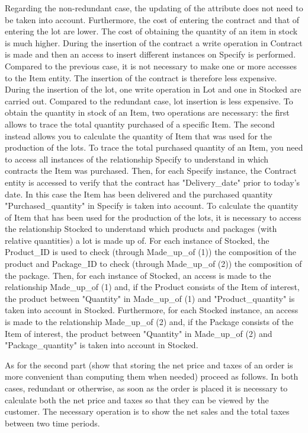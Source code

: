 Regarding the non-redundant case, the updating of the attribute does not need to be taken into account. Furthermore, the cost of entering the contract and that of entering the lot are lower. The cost of obtaining the quantity of an item in stock is much higher.
During the insertion of the contract a write operation in Contract is made and then an access to insert different instances on Specify is performed. Compared to the previous case, it is not necessary to make one or more accesses to the Item entity. The insertion of the contract is therefore less expensive.
During the insertion of the lot, one write operation in Lot and one in Stocked are carried out. Compared to the redundant case, lot insertion is less expensive.
To obtain the quantity in stock of an Item, two operations are necessary: ​​the first allows to trace the total quantity purchased of a specific Item. The second instead allows you to calculate the quantity of Item that was used for the production of the lots.
To trace the total purchased quantity of an Item, you need to access all instances of the relationship Specify to understand in which contracts the Item was purchased. Then, for each Specify instance, the Contract entity is accessed to verify that the contract has "Delivery\_date" prior to today's date. In this case the Item has been delivered and the purchased quantity "Purchased\_quantity" in Specify is taken into account.
To calculate the quantity of Item that has been used for the production of the lots, it is necessary to access the relationship Stocked to understand which products and packages (with relative quantities) a lot is made up of. For each instance of Stocked, the Product\_ID is used to check (through Made\_up\_of (1)) the composition of the product and Package\_ID to check (through Made\_up\_of (2)) the composition of the package. Then, for each instance of Stocked, an access is made to the relationship Made\_up\_of (1) and, if the Product consists of the Item of interest, the product between "Quantity" in Made\_up\_of (1) and "Product\_quantity" is taken into account in Stocked. Furthermore, for each Stocked instance, an access is made to the relationship Made\_up\_of (2) and, if the Package consists of the Item of interest, the product between "Quantity" in Made\_up\_of (2) and "Package\_quantity" is taken into account in Stocked.


As for the second part (show that storing the net price and taxes of an order is more convenient than computing them when needed) proceed as follows.
In both cases, redundant or otherwise, as soon as the order is placed it is necessary to calculate both the net price and taxes so that they can be viewed by the customer.
The necessary operation is to show the net sales and the total taxes between two time periods.

